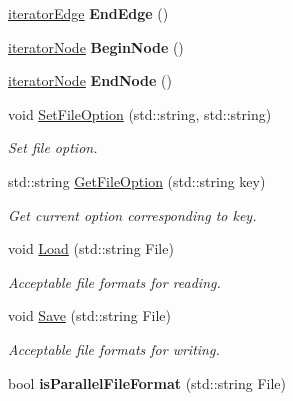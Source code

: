 \begin{DoxyCompactItemize}
\item 
\hypertarget{classINMOST_1_1Mesh_ac2f40383f4780d877be0291b5d1c4c85}{\hyperlink{classINMOST_1_1Mesh_1_1base__iterator}{iterator\-Edge} {\bfseries End\-Edge} ()}\label{classINMOST_1_1Mesh_ac2f40383f4780d877be0291b5d1c4c85}

\item 
\hypertarget{classINMOST_1_1Mesh_ab832696d5dfd3340153dedb5dc86974d}{\hyperlink{classINMOST_1_1Mesh_1_1base__iterator}{iterator\-Node} {\bfseries Begin\-Node} ()}\label{classINMOST_1_1Mesh_ab832696d5dfd3340153dedb5dc86974d}

\item 
\hypertarget{classINMOST_1_1Mesh_a424e61945ab061054cf896db3831d7ec}{\hyperlink{classINMOST_1_1Mesh_1_1base__iterator}{iterator\-Node} {\bfseries End\-Node} ()}\label{classINMOST_1_1Mesh_a424e61945ab061054cf896db3831d7ec}

\item 
void \hyperlink{classINMOST_1_1Mesh_a07c75e9dee2c400225a6095e45489ac1}{Set\-File\-Option} (std\-::string, std\-::string)
\begin{DoxyCompactList}\small\item\em Set file option. \end{DoxyCompactList}\item 
std\-::string \hyperlink{classINMOST_1_1Mesh_a1b5d5a48564cae0b29d152cc40673632}{Get\-File\-Option} (std\-::string key)
\begin{DoxyCompactList}\small\item\em Get current option corresponding to key. \end{DoxyCompactList}\item 
void \hyperlink{classINMOST_1_1Mesh_a5dfd481d638b2d2d72193b4b8fa159a4}{Load} (std\-::string File)
\begin{DoxyCompactList}\small\item\em Acceptable file formats for reading. \end{DoxyCompactList}\item 
void \hyperlink{classINMOST_1_1Mesh_ac12ba58210b79c61e64a74c389cd11f6}{Save} (std\-::string File)
\begin{DoxyCompactList}\small\item\em Acceptable file formats for writing. \end{DoxyCompactList}\item 
\hypertarget{classINMOST_1_1Mesh_a61ed94fed9a6ebc229a814c562c2a683}{bool {\bfseries is\-Parallel\-File\-Format} (std\-::string File)}\label{classINMOST_1_1Mesh_a61ed94fed9a6ebc229a814c562c2a683}


\end{DoxyCompactItemize}
